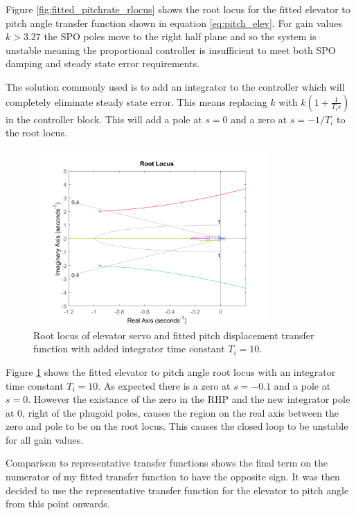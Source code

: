 \documentclass{article}
\begin{document}
Figure \ref{fig:fitted_pitchrate_rlocus} shows the root locus for the fitted elevator to pitch angle transfer function shown in equation \ref{eq:pitch_elev}.
For gain values $k>3.27$ the SPO poles move to the right half plane and so the system is unstable meaning the proportional controller is insufficient to meet both SPO damping and steady state error requirements.

The solution commonly used is to add an integrator to the controller which will completely eliminate steady state error.
This means replacing $k$ with $k(1 + \frac{1}{T_i s})$ in the controller block.
This will add a pole at $s=0$ and a zero at $s=-1/T_i$ to the root locus.

\begin{figure}[H]
    \centering
    \includegraphics[width=0.8\textwidth]{figures/pitch_autopilot_locus_intbad.png}
    \caption{Root locus of elevator servo and fitted pitch displacement transfer function with added integrator time constant $T_i = 10$.}
    \label{fig:fitted_pitchrate_rlocus_int}
\end{figure}

Figure \ref{fig:fitted_pitchrate_rlocus_int} shows the fitted elevator to pitch angle root locus with an integrator time constant $T_i = 10$.
As expected there is a zero at $s=-0.1$ and a pole at $s=0$.
However the existance of the zero in the RHP and the new integrator pole at 0, right of the phugoid poles, causes the region on the real axis between the zero and pole to be on the root locus.
This causes the closed loop to be unstable for all gain values.

Comparison to representative transfer functions \cite{rep} shows the final term on the numerator of my fitted transfer function to have the opposite sign.
It was then decided to use the representative transfer function for the elevator to pitch angle from this point onwards.
\end{document}
